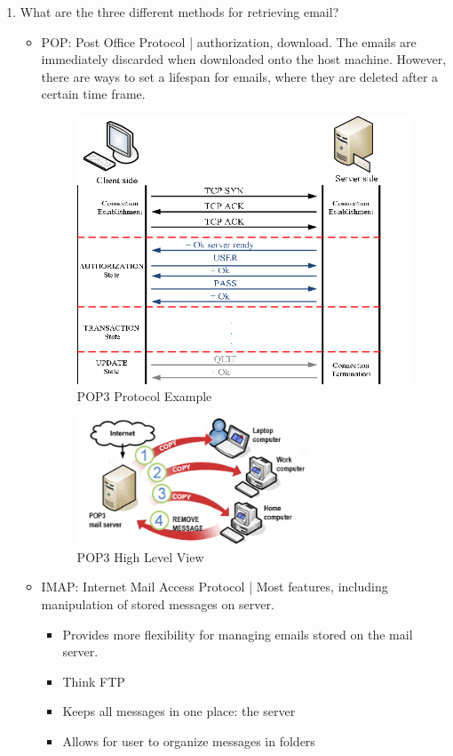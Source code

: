 \documentclass{article}
\begin{document}
\begin{enumerate}
\newpage

\item What are the three different methods for retrieving email?

\begin{itemize}
\item POP: Post Office Protocol | authorization, download. The emails are immediately discarded when downloaded onto the host machine. However, there are ways to set a lifespan for emails, where they are deleted after a certain time frame.
\begin{figure}[!h]
\centering
\includegraphics[width=10cm]{POP3-Client-Server-Procedure}
\caption{POP3 Protocol Example}
\end{figure}
\begin{figure}[!h]
\centering
\includegraphics[width=7cm]{pop3_usage}
\caption{POP3 High Level View}
\end{figure}
\newpage
\item IMAP: Internet Mail Access Protocol | Most features, including manipulation of stored messages on server. 
\begin{itemize}
\item Provides more flexibility for managing emails stored on the mail server.
\item Think FTP
\item Keeps all messages in one place: the server
\item Allows for user to organize messages in folders

\end{itemize}
\end{itemize}
\end{enumerate}
\end{document}
